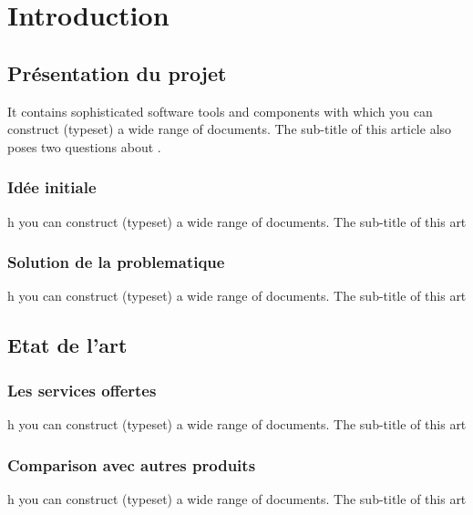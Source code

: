 {

\pagestyle{fancy}

\pagestyle{fancy}
\fancyhead{}


\hypersetup{linkcolor=black}


\tableofcontents\thispagestyle{fancy}
\listoffigures
\listoftables

\pagebreak
{}
\chapter{Introduction}\thispagestyle{fancy}


\section{Présentation du projet}
It contains sophisticated software tools and components with which you can construct (typeset) a wide range of documents. The sub-title of this article also poses two questions about .

\subsection{Idée initiale}
h you can construct (typeset) a wide range of documents. The sub-title of this art

\subsection{Solution de la problematique}
h you can construct (typeset) a wide range of documents. The sub-title of this art


\section{Etat de l'art}

\subsection{Les services offertes}
h you can construct (typeset) a wide range of documents. The sub-title of this art

\subsection{Comparison avec autres produits}
h you can construct (typeset) a wide range of documents. The sub-title of this art

}
